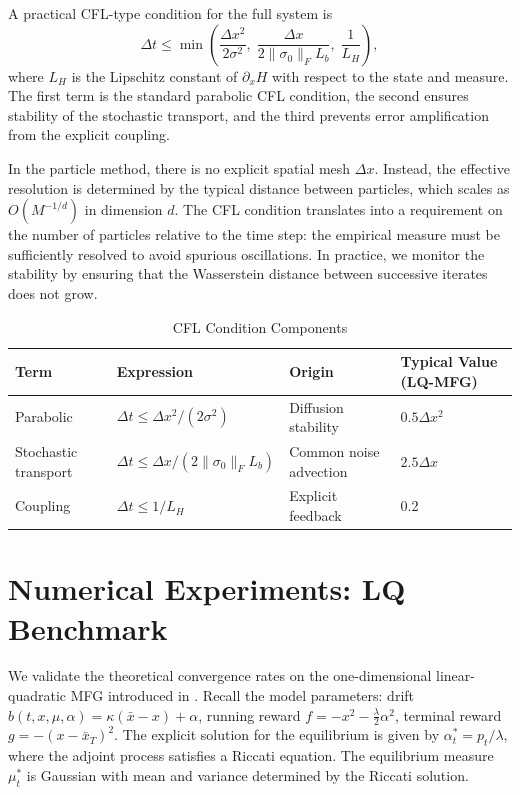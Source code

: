 A practical CFL-type condition for the full system is
\begin{equation}
    \Delta t \leq \min\left( \frac{\Delta x^2}{2\sigma^2}, \;
    \frac{\Delta x}{2\|\sigma_0\|_F L_b}, \; \frac{1}{L_H} \right),
    \label{eq:cfl-condition}
\end{equation}
where $L_H$ is the Lipschitz constant of $\partial_x H$ with respect to the state and
measure. The first term is the standard parabolic CFL condition, the second ensures
stability of the stochastic transport, and the third prevents error amplification
from the explicit coupling.

In the particle method, there is no explicit spatial mesh $\Delta x$. Instead, the
effective resolution is determined by the typical distance between particles, which
scales as $O(M^{-1/d})$ in dimension $d$. The CFL condition translates into a
requirement on the number of particles relative to the time step: the empirical
measure must be sufficiently resolved to avoid spurious oscillations. In practice, we
monitor the stability by ensuring that the Wasserstein distance between successive
iterates does not grow.

\begin{table}[ht]
\centering
\caption{CFL Condition Components}
\label{tab:cfl-components}
\begin{tabular}{p{3.2cm}p{3.8cm}p{3.5cm}p{2.5cm}}
\toprule
\textbf{Term} & \textbf{Expression} & \textbf{Origin} & \textbf{Typical Value
    (LQ-MFG)} \\
\midrule
Parabolic & $\Delta t \leq \Delta x^2/(2\sigma^2)$ & Diffusion stability & $0.5\Delta
    x^2$ \\
Stochastic transport & $\Delta t \leq \Delta x/(2\|\sigma_0\|_F L_b)$ & Common noise
    advection & $2.5\Delta x$ \\
Coupling & $\Delta t \leq 1/L_H$ & Explicit feedback & 0.2 \\
\bottomrule
\end{tabular}
\end{table}


\section{Numerical Experiments: LQ Benchmark}
\label{sec:na-experiments}

We validate the theoretical convergence rates on the one-dimensional linear-quadratic
MFG introduced in . Recall the model parameters: drift
$b(t,x,\mu,\alpha) = \kappa(\bar{x}-x) + \alpha$, running reward
$f = -x^2 - \tfrac{\lambda}{2}\alpha^2$, terminal reward $g = -(x-\bar{x}_T)^2$. The
explicit solution for the equilibrium is given by $\alpha_t^* = p_t/\lambda$, where the
adjoint process satisfies a Riccati equation. The equilibrium measure $\mu_t^*$ is
Gaussian with mean and variance determined by the Riccati solution.

